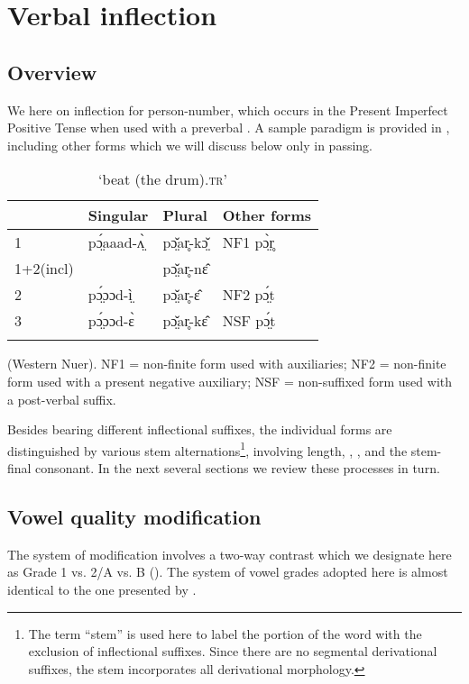 \documentclass[output=paper,newtxmath,modfonts,nonflat,draftmode]{langsci/langscibook}
\begin{document}
\section{Verbal inflection}
\subsection{Overview} %

We  here on inflection for  person-number, which occurs in the Present Imperfect Positive Tense when used with a preverbal . A sample paradigm is provided in , including other forms which we will discuss below only in passing.

\begin{table}
\caption{‘beat (the drum)\textsc{.tr}’}
\label{tab:monich:3}
\begin{tabularx}{\textwidth}{XXXl}
\lsptoprule
 & \bfseries Singular & {\bfseries Plural} & \bfseries Other forms\\
\midrule
1   & pɔ̤́aaad-ʌ̤̀ & {pɔ̤̌ar̥-kɔ̤̌ } &   NF1 pɔ̤̀r̥\\
1+2(incl) &    & {pɔ̤̌ar̥-nɛ̂ } & \\
2   & pɔ̤́ɔɔd-ì̤ & {pɔ̤̌ar̥-ɛ̂} & NF2 pɔ̤́t\\
3   & pɔ̤́ɔɔd-ɛ̀ & {pɔ̤̌ar̥-kɛ̂} & NSF pɔ̤́t\\
\lspbottomrule
\end{tabularx}
\parbox{\textwidth}{\small\raggedright(Western Nuer).
NF1 = non-finite form used with  auxiliaries;
NF2 = non-finite form used with a present negative auxiliary;
NSF = non-suffixed form used with a post-verbal suffix.
}
\end{table}


Besides bearing different inflectional suffixes, the individual forms are distinguished by various stem alternations\footnote{The\label{fn:monich:3} term “stem” is used here to label the portion of the word with the exclusion of inflectional suffixes. Since there are no segmental derivational suffixes, the stem incorporates all derivational morphology.}, involving length, , , and the stem-final consonant. In the next several sections we review these processes in turn. 

\subsection{Vowel quality modification} %

The system of  modification involves a two-way contrast which we designate here as Grade 1 vs. 2/A vs. B (). The system of vowel grades adopted here is almost identical to the one presented by \citet{reid2016}.
\end{document}
